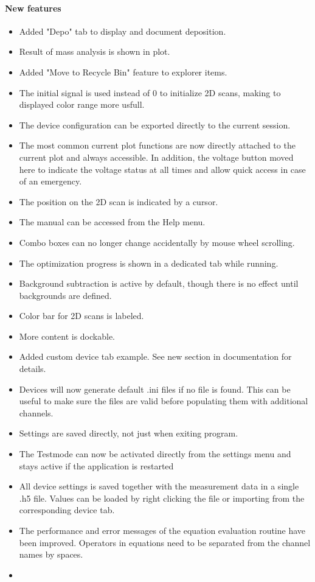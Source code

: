 \documentclass[a4paper,11pt,DIV=13]{scrartcl}
\begin{document}
\paragraph{New features}
\begin{itemize}
\item Added "Depo" tab to display and document deposition.
\item Result of mass analysis is shown in plot.
\item Added "Move to Recycle Bin" feature to explorer items.
\item The initial signal is used instead of 0 to initialize 2D scans, making to displayed color range more usfull.
\item The device configuration can be exported directly to the current session.
\item The most common current plot functions are now directly attached to the current plot and always accessible. In addition, the voltage button moved here to indicate the voltage status at all times and allow quick access in case of an emergency.
\item The position on the 2D scan is indicated by a cursor.
\item The manual can be accessed from the Help menu.
\item Combo boxes can no longer change accidentally by mouse wheel scrolling.
\item The optimization progress is shown in a dedicated tab while running.
\item Background subtraction is active by default, though there is no effect until backgrounds are defined.
\item Color bar for 2D scans is labeled.
\item More content is dockable.
\item Added custom device tab example. See new section in documentation for details.
\item Devices will now generate default .ini files if no file is found. This can be useful to make sure the files are valid before populating them with additional channels.
\item Settings are saved directly, not just when exiting program.
\item The Testmode can now be activated directly from the settings menu and stays active if the application is restarted
\item All device settings is saved together with the measurement data in a single .h5 file. Values can be loaded by right clicking the file or importing from the corresponding device tab.
\item The performance and error messages of the equation evaluation routine have been improved. Operators in equations need to be separated from the channel names by spaces.
\item 
\end{itemize}
\end{document}
